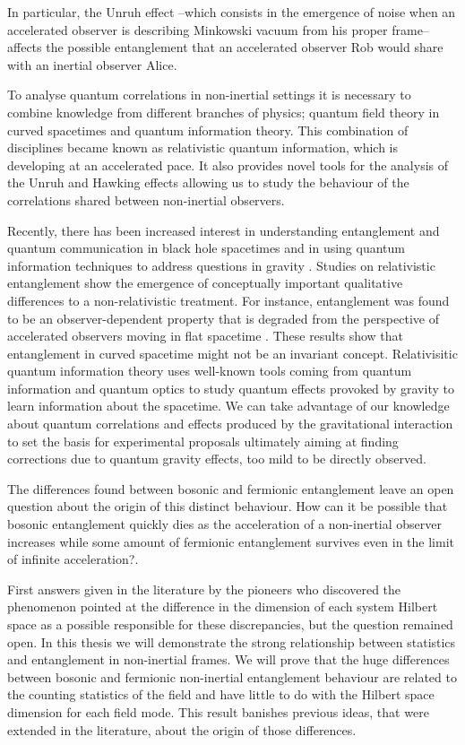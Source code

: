  In particular, the Unruh effect \cite{DaviesUnr,Unruh0,Takagi,Crispino} --which consists in the emergence of noise when an accelerated observer is describing Minkowski vacuum from his proper frame-- affects the possible entanglement that an accelerated observer Rob would share with an inertial observer Alice. 

To analyse quantum correlations in non-inertial settings it is necessary to combine knowledge from different branches of physics; quantum field theory in curved spacetimes and quantum information theory. This combination of disciplines became known as relativistic quantum information, which is developing at an accelerated pace. It also provides novel tools for the analysis of the Unruh and Hawking effects \cite{DaviesUnr,Unruh,Takagi,Crispino,Hawking} allowing us to study the behaviour of the correlations shared between non-inertial observers.

Recently, there has been increased interest in understanding entanglement and
quantum communication in black hole spacetimes
\cite{Xian,Pan2,Ahntropez} and in using quantum information techniques
to address questions in gravity \cite{Ternada,Ternada2}. Studies on
relativistic entanglement show the emergence of conceptually important
qualitative differences to a non-relativistic treatment. For
instance, entanglement was found to be an observer-dependent
property that is degraded from the perspective of accelerated
observers moving in flat spacetime \cite{Alicefalls,AlsingSchul,Adeschul,Villalba}.
These results show that entanglement in curved spacetime might
not be an invariant concept. Relativisitic quantum information theory uses well-known tools coming from quantum information and quantum optics to study quantum effects provoked by gravity to learn information about the spacetime. We can take advantage of our knowledge about quantum correlations and effects produced by the gravitational interaction to set the basis for experimental proposals ultimately aiming at finding corrections due to quantum gravity effects, too mild to be directly observed.


The differences found between bosonic \cite{Alicefalls} and fermionic \cite{AlsingSchul} entanglement leave an open question about the origin of this distinct behaviour. How can it be possible that bosonic entanglement quickly dies as the acceleration of a non-inertial observer increases while some amount of fermionic entanglement survives even in the limit of infinite acceleration?.

First answers given in the literature by the pioneers who discovered the phenomenon pointed at the difference in the dimension of each system Hilbert space as a possible responsible for these discrepancies, but the question remained open. In this thesis we will demonstrate the strong relationship between statistics and entanglement in non-inertial frames. We will prove that the huge differences between bosonic and fermionic non-inertial entanglement behaviour are related to the counting statistics of the field and have little to do with the Hilbert space dimension for each field mode. This result banishes previous ideas, that were extended in the literature, about the origin of those differences.

